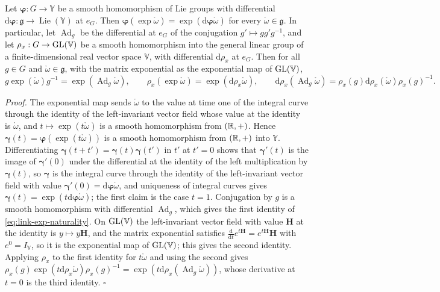 Let $\boldsymbol\varphi:G\to\mathbb Y$ be a smooth homomorphism of Lie groups with differential
$\mathrm d\boldsymbol\varphi:\mathfrak g\to\operatorname{Lie}(\mathbb Y)$ at $e_G$. Then
$\boldsymbol\varphi(\exp\mathring\omega)=\exp(\mathrm d\boldsymbol\varphi\mathring\omega)$ for every
$\mathring\omega\in\mathfrak g$. In particular, let $\operatorname{Ad}_g$ be the differential at $e_G$
of the conjugation $g'\mapsto gg'g^{-1}$, and let $\rho_x:G\to\mathrm{GL}(\mathbb V)$ be a smooth homomorphism
into the general linear group of a finite-dimensional real vector space $\mathbb V$, with differential
$\mathrm d\rho_x$ at $e_G$. Then for all $g\in G$ and $\mathring\omega\in\mathfrak g$, with the matrix
exponential as the exponential map of $\mathrm{GL}(\mathbb V)$,
\begin{equation}
g\exp(\mathring\omega)g^{-1}=\exp(\operatorname{Ad}_g\mathring\omega),
\qquad
\rho_x(\exp\mathring\omega)=\exp(\mathrm d\rho_x\mathring\omega),
\qquad
\mathrm d\rho_x(\operatorname{Ad}_g\mathring\omega)=\rho_x(g)\mathrm d\rho_x(\mathring\omega)\rho_x(g)^{-1}.
\label{eq:link-exp-naturality}
\end{equation}

\noindent\emph{Proof.}
The exponential map sends $\mathring\omega$ to the value at time one of the integral curve through
the identity of the left-invariant vector field whose value at the identity is $\mathring\omega$, and
$t\mapsto\exp(t\mathring\omega)$ is a smooth homomorphism from $(\mathbb R,+)$. Hence
$\boldsymbol\gamma(t)=\boldsymbol\varphi(\exp(t\mathring\omega))$ is a smooth homomorphism from $(\mathbb R,+)$ into $\mathbb Y$.
Differentiating $\boldsymbol\gamma(t+t')=\boldsymbol\gamma(t)\boldsymbol\gamma(t')$ in $t'$ at $t'=0$ shows that $\boldsymbol\gamma'(t)$ is the image
of $\boldsymbol\gamma'(0)$ under the differential at the identity of the left multiplication by $\boldsymbol\gamma(t)$, so
$\boldsymbol\gamma$ is the integral curve through the identity of the left-invariant vector field with value
$\boldsymbol\gamma'(0)=\mathrm d\boldsymbol\varphi\mathring\omega$, and uniqueness of integral curves gives
$\boldsymbol\gamma(t)=\exp(t\mathrm d\boldsymbol\varphi\mathring\omega)$; the first claim is the case $t=1$. Conjugation by
$g$ is a smooth homomorphism with differential $\operatorname{Ad}_g$, which gives the first identity of
\cref{eq:link-exp-naturality}. On $\mathrm{GL}(\mathbb V)$ the left-invariant vector field with value
$\mathbf H$ at the identity is $y\mapsto y\mathbf H$, and the matrix exponential satisfies
$\frac{\mathrm d}{\mathrm dt}e^{t\mathbf H}=e^{t\mathbf H}\mathbf H$ with $e^{0}=I_{\mathbb V}$, so it is the
exponential map of $\mathrm{GL}(\mathbb V)$; this gives the second identity. Applying $\rho_x$ to the first
identity for $t\mathring\omega$ and using the second gives
$\rho_x(g)\exp(t\mathrm d\rho_x\mathring\omega)\rho_x(g)^{-1}=\exp(t\mathrm d\rho_x(\operatorname{Ad}_g\mathring\omega))$,
whose derivative at $t=0$ is the third identity. \hfill$\square$

